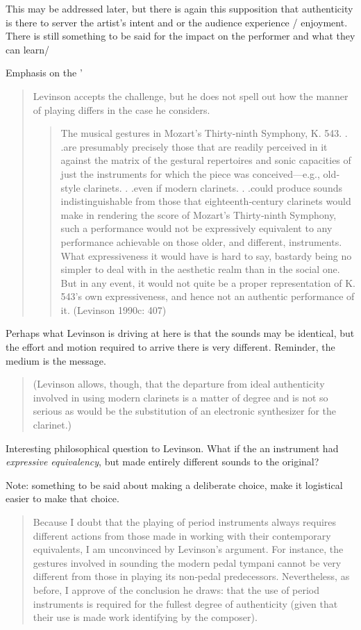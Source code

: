 This may be addressed later, but there is again this supposition that
authenticity is there to server the artist's intent and or the audience
experience / enjoyment. There is still something to be said for the impact on
the performer and what they can learn/

Emphasis on the '


\begin{quotation}
Levinson accepts the challenge, but he does not spell out how the manner of
playing differs in the case he considers.
\begin{quotation}
The musical gestures in Mozart's Thirty‐ninth Symphony, K. 543. . .are
presumably precisely those that are readily perceived in it against the matrix
of the gestural repertoires and sonic capacities of just the instruments for
which the piece was conceived—e.g., old‐style clarinets. . .even if modern
clarinets. . .could produce sounds indistinguishable from those that
eighteenth‐century clarinets would make in rendering the score of Mozart's
Thirty‐ninth Symphony, such a performance would not be expressively equivalent
to any performance achievable on those older, and different, instruments. What
expressiveness it would have is hard to say, bastardy being no simpler to deal
with in the aesthetic realm than in the social one. But in any event, it would
not quite be a proper representation of K. 543's own expressiveness, and hence
not an authentic performance of it. (Levinson 1990c: 407)
\end{quotation}
\end{quotation}

Perhaps what Levinson is driving at here is that the sounds may be identical,
but the effort and motion required to arrive there is very different. Reminder,
the medium is the message.

\begin{quotation}
(Levinson allows, though, that the departure from ideal authenticity involved in
using modern clarinets is a matter of degree and is not so serious as would be
the substitution of an electronic synthesizer for the clarinet.)
\end{quotation}
Interesting philosophical question to Levinson. What if the an instrument had
\textit{expressive equivalency}, but made entirely different sounds to the
original?

Note: something to be said about making a deliberate choice, make it logistical
easier to make that choice.

\begin{quotation}
Because I doubt that the playing of period instruments always requires different
actions from those made in working with their contemporary equivalents, I am
unconvinced by Levinson's argument. For instance, the gestures involved in
sounding the modern pedal tympani cannot be very different from those in playing
its non‐pedal predecessors. Nevertheless, as before, I approve of the conclusion
he draws: that the use of period instruments is required for the fullest degree
of authenticity (given that their use is made work identifying by the composer).
\end{quotation}

